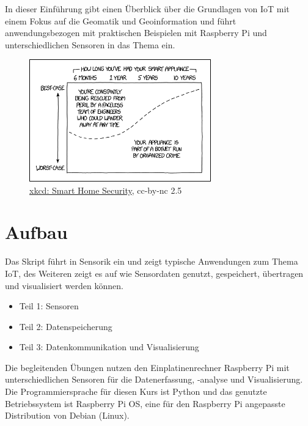 \documentclass[
  11pt,
  a4paper,
  oneside, openany  ,captions=tableheading
]{scrbook}
\providecommand{\tightlist}{%
  \setlength{\itemsep}{0pt}\setlength{\parskip}{0pt}}
\theoremstyle{remark}
\renewcommand{\markright}[1]{\def\chaptertitle{#1}} %
\begin{document}
In dieser Einführung gibt einen Überblick über die Grundlagen von IoT
mit einem Fokus auf die Geomatik und Geoinformation und führt
anwendungsbezogen mit praktischen Beispielen mit Raspberry Pi und
unterschiedlichen Sensoren in das Thema ein.

\begin{figure}[H]

{\centering \includegraphics[width=0.7\textwidth,height=\textheight]{images/xkcd_1966_smart_home_security.png}

}

\caption{\href{https://xkcd.com/1966/}{xkcd: Smart Home Security},
cc-by-nc 2.5}

\end{figure}%

\section*{Aufbau}\label{aufbau}

\markright{Aufbau}

Das Skript führt in Sensorik ein und zeigt typische Anwendungen zum
Thema IoT, des Weiteren zeigt es auf wie Sensordaten genutzt,
gespeichert, übertragen und visualisiert werden können.

\begin{itemize}
\tightlist
\item
  Teil 1: Sensoren
\item
  Teil 2: Datenspeicherung
\item
  Teil 3: Datenkommunikation und Visualisierung
\end{itemize}

Die begleitenden Übungen nutzen den Einplatinenrechner Raspberry Pi mit
unterschiedlichen Sensoren für die Datenerfassung, -analyse und
Visualisierung. Die Programmiersprache für diesen Kurs ist Python und
das genutzte Betriebssystem ist Raspberry Pi OS, eine für den Raspberry
Pi angepasste Distribution von Debian (Linux).
\end{document}
